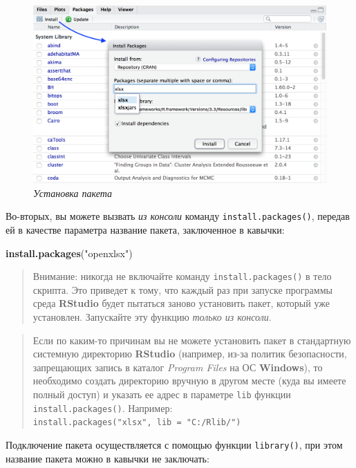 \documentclass[]{book}
\newenvironment{Shaded}{\begin{snugshade}}{\end{snugshade}}
\newcommand{\KeywordTok}[1]{\textcolor[rgb]{0.13,0.29,0.53}{\textbf{#1}}}
\newcommand{\StringTok}[1]{\textcolor[rgb]{0.31,0.60,0.02}{#1}}
\newcommand{\NormalTok}[1]{#1}
\begin{document}
\begin{figure}
\centering
\includegraphics{images/InstallPackages.png}
\caption{\emph{Установка пакета}}
\end{figure}

Во-вторых, вы можете вызвать \emph{из консоли} команду
\texttt{install.packages()}, передав ей в качестве параметра название
пакета, заключенное в кавычки:

\begin{Shaded}
\begin{Highlighting}[]
\KeywordTok{install.packages}\NormalTok{(}\StringTok{"openxlsx"}\NormalTok{)}
\end{Highlighting}
\end{Shaded}

\begin{quote}
Внимание: никогда не включайте команду \texttt{install.packages()} в
тело скрипта. Это приведет к тому, что каждый раз при запуске программы
среда \textbf{RStudio} будет пытаться заново установить пакет, который
уже установлен. Запускайте эту функцию \emph{только из консоли}.
\end{quote}

\begin{quote}
Если по каким-то причинам вы не можете установить пакет в стандартную
системную директорию \textbf{RStudio} (например, из-за политик
безопасности, запрещающих запись в каталог \emph{Program Files} на ОС
\textbf{Windows}), то необходимо создать директорию вручную в другом
месте (куда вы имеете полный доступ) и указать ее адрес в параметре
\texttt{lib} функции \texttt{install.packages()}. Например:
\texttt{install.packages("xlsx",\ lib\ =\ "C:/Rlib/")}
\end{quote}

Подключение пакета осуществляется с помощью функции \texttt{library()},
при этом название пакета можно в кавычки не заключать:
\end{document}
